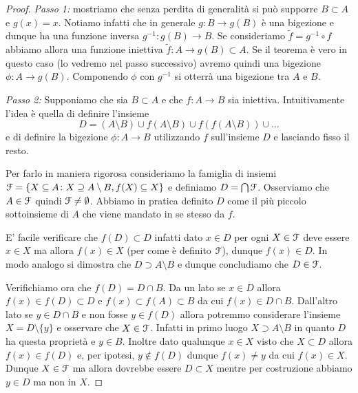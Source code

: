 \begin{proof}
\emph{Passo 1:}
mostriamo che senza perdita di generalità si può supporre $B\subset A$
e $g(x)=x$.
Notiamo infatti che in generale $g\colon B\to g(B)$ è una bigezione e dunque
ha una funzione inversa $g^{-1}\colon g(B)\to B$.
Se consideriamo $\tilde f = g^{-1}\circ f$ abbiamo allora una 
funzione iniettiva $\tilde f\colon A \to g(B)\subset A$.
Se il teorema è vero in questo caso (lo vedremo nel passo successivo) 
avremo quindi una bigezione $\phi\colon A\to g(B)$. 
Componendo $\phi$ con $g^{-1}$ si otterrà una bigezione tra $A$ e $B$.

\emph{Passo 2:}
Supponiamo che sia $B\subset A$ e che $f\colon A \to B$ sia iniettiva.
Intuitivamente l'idea è quella di definire l'insieme
\[
 D = (A\setminus B)  
 \cup f(A\setminus B) 
 \cup f(f(A\setminus B)) 
 \cup \dots
\]
e di definire la bigezione $\phi \colon A \to B$ 
utilizzando $f$ sull'insieme $D$ e lasciando fisso
il resto.

Per farlo in maniera rigorosa
consideriamo la famiglia di insiemi 
$\mathcal F = \{X \subseteq A \colon X \supseteq A \setminus B, f(X) \subseteq X\}$ 
e definiamo $D = \bigcap \mathcal F$.
Osserviamo che $A \in \mathcal F$ quindi $\mathcal F\neq \emptyset$.
Abbiamo in pratica definito $D$ come il più piccolo 
sottoinsieme di $A$ che viene mandato in se stesso da $f$.

E' facile verificare che $f(D) \subset D$ infatti dato $x\in D$ per ogni $X\in \mathcal F$ deve essere $x\in X$ ma allora $f(x) \in X$ (per come è definito $\mathcal F$), dunque $f(x) \in D$. 
In modo analogo si dimostra che $D\supset A\setminus B$ e dunque concludiamo che $D\in \mathcal F$.

Verifichiamo ora che $f(D)=D\cap B$. Da un lato se $x\in D$ allora
$f(x) \in f(D)\subset D$ e $f(x)\subset f(A)\subset B$ da cui $f(x) \in D\cap B$.
Dall'altro lato se $y\in D \cap B$ e non fosse $y \in f(D)$
allora potremmo considerare l'insieme $X=D\setminus\{y\}$
e osservare che $X\in \mathcal F$.
Infatti in primo luogo $X \supset A \setminus B$ in quanto $D$ ha questa proprietà e $y \in B$.
Inoltre dato qualunque $x \in X$ visto che $X\subset D$ allora
$f(x) \in f(D)$ e, per ipotesi,
$y\not \in f(D)$ dunque $f(x)\neq y$ da cui $f(x) \in X$.
Dunque $X\in \mathcal F$ ma allora dovrebbe essere $D\subset X$ mentre
per costruzione abbiamo $y\in D$ ma non in $X$.



\end{proof}

